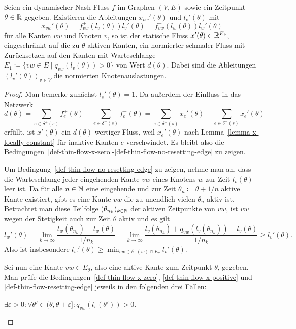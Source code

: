 \begin{theorem}
	Seien ein dynamischer Nash-Fluss $f$ im Graphen $(V,E)$ sowie ein Zeitpunkt $\theta\in\mathbb{R}$ gegeben.
	Existieren die Ableitungen $x_{vw}'(\theta)$ und $l_v'(\theta)$ mit 
	\[
	x_{vw}'(\theta) = f_{vw}^+(l_v(\theta)) l_v'(\theta)= f_{vw}^-(l_w(\theta))l_w'(\theta)
	\]
	für alle Kanten $vw$ und Knoten $v$, so ist der statische Fluss $x'(\theta) \in \mathbb{R}^{E_\theta}$, eingeschränkt auf die zu $\theta$ aktiven Kanten, ein normierter schmaler Fluss mit Zurück\-setzen auf den Kanten mit Warteschlange $E_1\coloneq \{vw\in E \mid q_{vw}(l_v(\theta))>0 \}$ von Wert $d(\theta)$.
	Dabei sind die Ableitungen $(l_v'(\theta))_{v\in V}$ die normierten Knotenauslastungen.
\end{theorem}
\begin{proof}
	Man bemerke zunächst $l_s'(\theta) = 1$.
	Da außerdem der Einfluss in das Netzwerk 
	\[
	d(\theta)= \sum_{e\in \delta^+(s)} f_e^+(\theta) - \sum_{e\in\delta^-(s)} f_e^-(\theta) = \sum_{e\in \delta^+(s)} x_e'(\theta) - \sum_{e\in\delta^-(s)} x_e'(\theta)
	\]
	erfüllt, ist $x'(\theta)$ ein $d(\theta)$-wertiger Fluss, weil $x_e'(\theta)$ nach Lemma~\ref{lemma-x-locally-constant} für inaktive Kanten $e$ verschwindet. Es bleibt also die Bedingungen~\ref{def-thin-flow-x-zero}-\ref{def-thin-flow-no-resetting-edge} zu zeigen.
	
	Um Bedingung~\ref{def-thin-flow-no-resetting-edge} zu zeigen,
	nehme man an, dass die Warteschlange jeder eingehenden Kante $vw$ eines Knotens $w$ zur Zeit $l_v(\theta)$ leer ist.
	Da für alle $n\in\mathbb{N}$ eine eingehende und zur Zeit $\theta_n \coloneq \theta + 1/n$ aktive Kante existiert, gibt es eine Kante $vw$ die zu unendlich vielen $\theta_n$ aktiv ist.
	Betrachtet man diese Teilfolge $(\theta_{n_k})_{k\in\mathbb{N}}$ der aktiven Zeitpunkte von $vw$, ist $vw$ wegen der Stetigkeit auch zur Zeit $\theta$ aktiv und es gilt 
	\[
	l_w'(\theta) = \lim_{k\to\infty} \frac{l_w(\theta_{n_k})- l_w(\theta)}{1/n_k} = \lim_{k\to\infty} \frac{ l_v(\theta_{n_k}) + q_{vw}(l_v(\theta_{n_k})) - l_v(\theta) }{1/n_k} \geq l_v'(\theta).
	\]
	Also ist insbesondere $l_w'(\theta) \geq \min_{vw\in \delta^-(w)\cap E_\theta} l_v'(\theta)$.
	
	Sei nun eine Kante $vw\in E_\theta$, also eine aktive Kante zum Zeitpunkt $\theta$, gegeben. Man prüfe die Bedingungen~\ref{def-thin-flow-x-zero}, \ref{def-thin-flow-x-positive} und \ref{def-thin-flow-resetting-edge} jeweils in den folgenden drei Fällen:
	
	\begin{description}[leftmargin=0cm, topsep=0cm, itemindent=0.5cm]
		\item[1. Fall:] $\exists \varepsilon > 0:\forall \theta'\in (\theta, \theta + \varepsilon ] : q_{vw}(l_v(\theta')) > 0$.
		

\end{description}
\end{proof}
